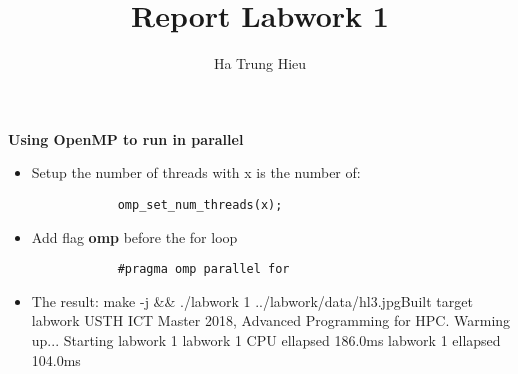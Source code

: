 \documentclass{article}
\title{Report Labwork 1}
\author{Ha Trung Hieu}
\begin{document}
\maketitle

\textbf{Using OpenMP to run in parallel}

\begin{itemize}
	\item Setup the number of threads with x is the number of:
		\begin{verbatim}
			omp_set_num_threads(x);
		\end{verbatim}
	\item Add flag \textbf{omp} before the for loop
		\begin{verbatim}
			#pragma omp parallel for
		\end{verbatim}
	\item The result:\newline
	make -j \&\& ./labwork 1 ../labwork/data/hl3.jpg\newline
	[100\%] Built target labwork\newline
	USTH ICT Master 2018, Advanced Programming for HPC.\newline
	Warming up...\newline
	Starting labwork 1\newline
	labwork 1 CPU ellapsed 186.0ms\newline
	labwork 1 ellapsed 104.0ms
\end{itemize}
\end{document}
